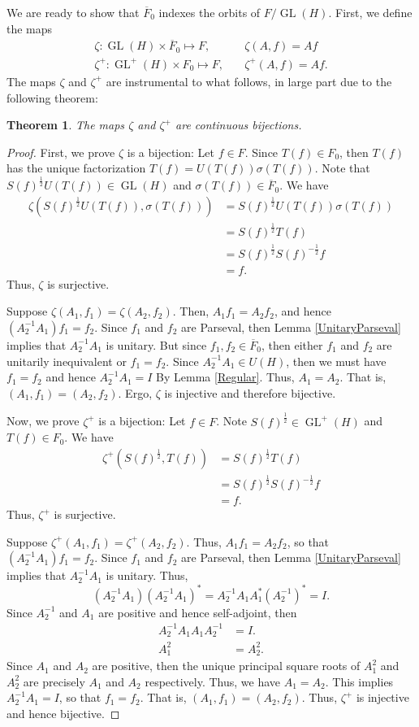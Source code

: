 \documentclass{article}
\newtheorem{thm}[defn]{Theorem}
\newcommand{\GL}{\operatorname{GL}}
\newcommand{\Fbar}{\overline{F}}
\begin{document}
We are ready to show that $\Fbar_0$ indexes the orbits of $F/\GL(H)$. First, we define the maps
\begin{align}
\zeta:\GL(H)\times\Fbar_0\mapsto F, \quad
&\zeta(A, f) = Af \\
\zeta^+:\GL^+(H)\times F_0\mapsto F, \quad
&\zeta^+(A, f) = Af.
\end{align}
The maps $\zeta$ and $\zeta^+$ are instrumental to what follows, in large part due to the following theorem:
\begin{thm} \label{zeta}
The maps $\zeta$ and $\zeta^+$ are continuous bijections.
\end{thm}
\begin{proof}
First, we prove $\zeta$ is a bijection: Let $f\in F$. Since $T(f)\in F_0$, then $T(f)$ has the unique factorization $T(f) = U(T(f))\sigma(T(f))$. Note that $S(f)^{\frac{1}{2}}U(T(f))\in \GL(H)$ and $\sigma(T(f))\in \Fbar_0$. We have
\begin{align*}
\zeta(S(f)^{\frac{1}{2}}U(T(f)), \sigma(T(f)))
&= S(f)^{\frac{1}{2}} U(T(f))\sigma(T(f)) \\
&= S(f)^{\frac{1}{2}} T(f) \\
&= S(f)^{\frac{1}{2}} S(f)^{-\frac{1}{2}} f \\
&= f.
\end{align*}
Thus, $\zeta$ is surjective.

Suppose $\zeta(A_1,f_1) = \zeta(A_2,f_2)$. Then, $A_1f_1=A_2f_2$, and hence $(A_2^{-1}A_1)f_1=f_2$. Since $f_1$ and $f_2$ are Parseval, then Lemma \ref{UnitaryParseval} implies that $A_2^{-1}A_1$ is unitary. But since $f_1,f_2\in\Fbar_0$, then either $f_1$ and $f_2$ are unitarily inequivalent or $f_1=f_2$. Since $A_2^{-1}A_1\in U(H)$, then we must have $f_1=f_2$ and hence $A_2^{-1}A_1=I$ By Lemma \ref{Regular}. Thus, $A_1=A_2$. That is, $(A_1,f_1)=(A_2,f_2)$. Ergo, $\zeta$ is injective and therefore bijective.

Now, we prove $\zeta^+$ is a bijection: Let $f\in F$. Note $S(f)^{\frac{1}{2}}\in\GL^+(H)$ and $T(f)\in F_0$. We have
\begin{align*}
\zeta^+(S(f)^{\frac{1}{2}}, T(f))
&= S(f)^{\frac{1}{2}} T(f) \\
&= S(f)^{\frac{1}{2}} S(f)^{-\frac{1}{2}} f \\
&= f.
\end{align*}
Thus, $\zeta^+$ is surjective.

Suppose $\zeta^+(A_1,f_1)=\zeta^+(A_2,f_2)$. Thus, $A_1f_1=A_2f_2$, so that $(A_2^{-1}A_1)f_1=f_2$. Since $f_1$ and $f_2$ are Parseval, then Lemma \ref{UnitaryParseval} implies that $A_2^{-1}A_1$ is unitary. Thus,
\[ (A_2^{-1}A_1)(A_2^{-1}A_1)^*
= A_2^{-1}A_1A_1^*(A_2^{-1})^*
= I. \]
Since $A_2^{-1}$ and $A_1$ are positive and hence self-adjoint, then
\begin{align*}
A_2^{-1}A_1A_1A_2^{-1} &= I. \\
A_1^2 &= A_2^2.
\end{align*}
Since $A_1$ and $A_2$ are positive, then the unique principal square roots of $A_1^2$ and $A_2^2$ are precisely $A_1$ and $A_2$ respectively. Thus, we have $A_1=A_2$. This implies $A_2^{-1}A_1=I$, so that $f_1=f_2$. That is, $(A_1,f_1)=(A_2,f_2)$. Thus, $\zeta^+$ is injective and hence bijective.


\end{proof}
\end{document}
